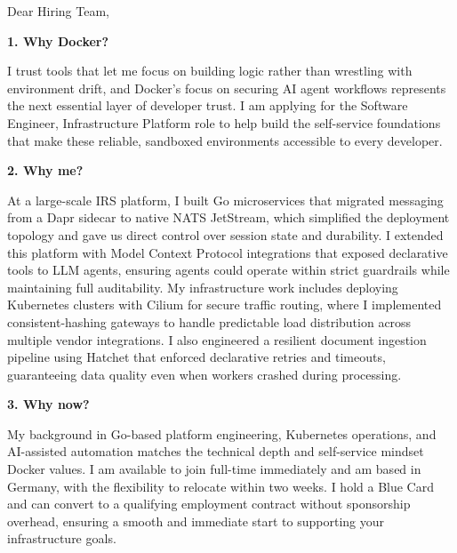 \documentclass[11pt,a4paper]{coverletter}
\begin{document}

\opening{Dear Hiring Team,}

\vspace{8pt}\noindent\textbf{1. Why Docker?}\par\vspace{3pt}

I trust tools that let me focus on building logic rather than wrestling with environment drift, and Docker's focus on securing AI agent workflows represents the next essential layer of developer trust. I am applying for the Software Engineer, Infrastructure Platform role to help build the self-service foundations that make these reliable, sandboxed environments accessible to every developer.

\vspace{8pt}\noindent\textbf{2. Why me?}\par\vspace{3pt}

At a large-scale IRS platform, I built Go microservices that migrated messaging from a Dapr sidecar to native NATS JetStream, which simplified the deployment topology and gave us direct control over session state and durability. I extended this platform with Model Context Protocol integrations that exposed declarative tools to LLM agents, ensuring agents could operate within strict guardrails while maintaining full auditability. My infrastructure work includes deploying Kubernetes clusters with Cilium for secure traffic routing, where I implemented consistent-hashing gateways to handle predictable load distribution across multiple vendor integrations. I also engineered a resilient document ingestion pipeline using Hatchet that enforced declarative retries and timeouts, guaranteeing data quality even when workers crashed during processing.

\vspace{8pt}\noindent\textbf{3. Why now?}\par\vspace{3pt}

My background in Go-based platform engineering, Kubernetes operations, and AI-assisted automation matches the technical depth and self-service mindset Docker values. I am available to join full-time immediately and am based in Germany, with the flexibility to relocate within two weeks. I hold a Blue Card and can convert to a qualifying employment contract without sponsorship overhead, ensuring a smooth and immediate start to supporting your infrastructure goals.
\end{document}

